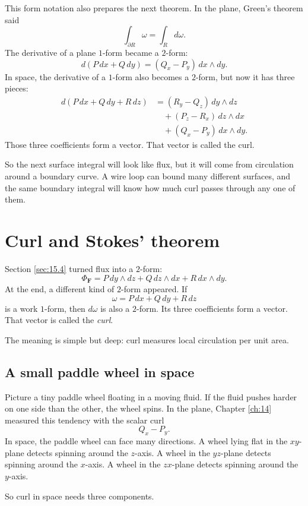 This form notation also prepares the next theorem.  In the plane, Green's theorem said
\[
    \int_{\partial R}\omega=\int_R d\omega.
\]
The derivative of a plane \(1\)-form became a \(2\)-form:
\[
    d(P\,dx+Q\,dy)=(Q_x-P_y)\,dx\wedge dy.
\]
In space, the derivative of a \(1\)-form also becomes a \(2\)-form, but now it has three
pieces:
\[
\begin{aligned}
d(P\,dx+Q\,dy+R\,dz)
&=
(R_y-Q_z)\,dy\wedge dz\\
&\quad+
(P_z-R_x)\,dz\wedge dx\\
&\quad+
(Q_x-P_y)\,dx\wedge dy.
\end{aligned}
\]
Those three coefficients form a vector.  That vector is called the curl.

So the next surface integral will look like flux, but it will come from circulation around
a boundary curve.  A wire loop can bound many different surfaces, and the same
boundary integral will know how much curl passes through any one of them.
\section{Curl and Stokes' theorem}
\label{sec:15.5}

Section \ref{sec:15.4} turned flux into a \(2\)-form:
\[
    \Phi_{\mathbf F}
    =
    P\,dy\wedge dz
    +
    Q\,dz\wedge dx
    +
    R\,dx\wedge dy.
\]
At the end, a different kind of \(2\)-form appeared.  If
\[
    \omega=P\,dx+Q\,dy+R\,dz
\]
is a work \(1\)-form, then \(d\omega\) is also a \(2\)-form.  Its three coefficients form
a vector.  That vector is called the \emph{curl}.

The meaning is simple but deep: curl measures local circulation per unit area.

\subsection{A small paddle wheel in space}

Picture a tiny paddle wheel floating in a moving fluid.  If the fluid pushes harder on
one side than the other, the wheel spins.  In the plane, Chapter \ref{ch:14} measured
this tendency with the scalar curl
\[
    Q_x-P_y.
\]
In space, the paddle wheel can face many directions.  A wheel lying flat in the
\(xy\)-plane detects spinning around the \(z\)-axis.  A wheel in the \(yz\)-plane detects
spinning around the \(x\)-axis.  A wheel in the \(zx\)-plane detects spinning around
the \(y\)-axis.

So curl in space needs three components.

